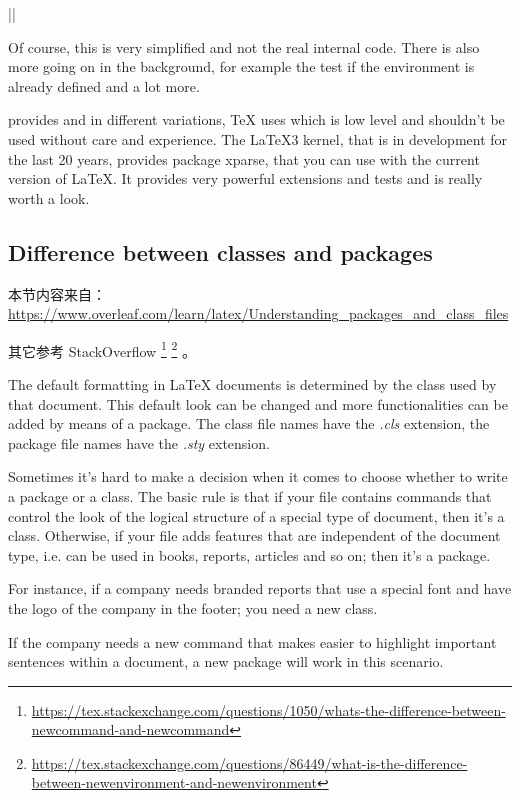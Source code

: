 |\newcommand{\endmacro}{<code to end the environment>}|

Of course, this is very simplified and not the real internal code. There is also more going on in the background, for example the test if the environment is already defined and a lot more.

{\LaTeXe} provides  and  in different variations, 
{\TeX} uses  which is low level and shouldn't be used without care and experience.
The {\LaTeX3} kernel, that is in development for the last 20 years, provides package xparse, 
that you can use with the current version of {\LaTeX}. It provides very powerful extensions and tests and is really worth a look.

\subsection{Difference between classes and packages}

本节内容来自：\url{https://www.overleaf.com/learn/latex/Understanding_packages_and_class_files}

其它参考 StackOverflow
\footnote{\url{https://tex.stackexchange.com/questions/1050/whats-the-difference-between-newcommand-and-newcommand}}
\footnote{\url{https://tex.stackexchange.com/questions/86449/what-is-the-difference-between-newenvironment-and-newenvironment}}
。

The default formatting in {\LaTeX} documents is determined by the class used by that document. 
This default look can be changed and more functionalities can be added by means of a package. 
The class file names have the \textit{.cls} extension, the package file names have the \textit{.sty} extension.

Sometimes it's hard to make a decision when it comes to choose whether to write a package or a class. 
The basic rule is that if your file contains commands that control the look of the logical structure of a special type of document, then it's a class. 
Otherwise, if your file adds features that are independent of the document type, i.e. can be used in books, reports, articles and so on; then it's a package.

For instance, if a company needs branded reports that use a special font and have the logo of the company in the footer; you need a new class.

If the company needs a new command that makes easier to highlight important sentences within a document, a new package will work in this scenario.

